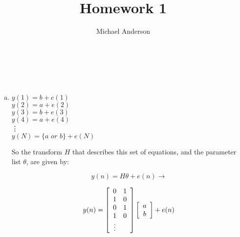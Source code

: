 \documentclass{article}
\author{Michael Anderson}
\title{Homework 1}
\begin{document}
\setlength{\parskip}{1em}
\maketitle
{}
\\
\flushleft
\newpage
\thispagestyle{empty}
\mbox{}
\pagebreak

\section{}
\begin{enumerate}[(a)]
\item
$y(1) = b + e(1)$\\
$y(2) = a + e(2)$\\
$y(3) = b + e(3)$\\
$y(4) = a + e(4)$\\
\hspace{1pt} \vdots \\
$y(N) = \{a \hspace{4pt} or \hspace{4pt} b\} + e(N)$
\vspace{1em}

So the transform $H$ that describes this set of equations, and the parameter
list $\theta$, are given by:

\[
y(n) = H\theta + e(n) \rightarrow
\]

\[
y(n) =
\left[ \begin{array}{c c}
0 & 1 \\
1 & 0 \\
0 & 1 \\
1 & 0 \\
\vdots \\
\end{array}
\right]
\left[ \begin{array}{c}
a \\
b \\
\end{array} \right]
+ e(n)
\]

\vspace{15pt}


\end{enumerate}
\end{document}
